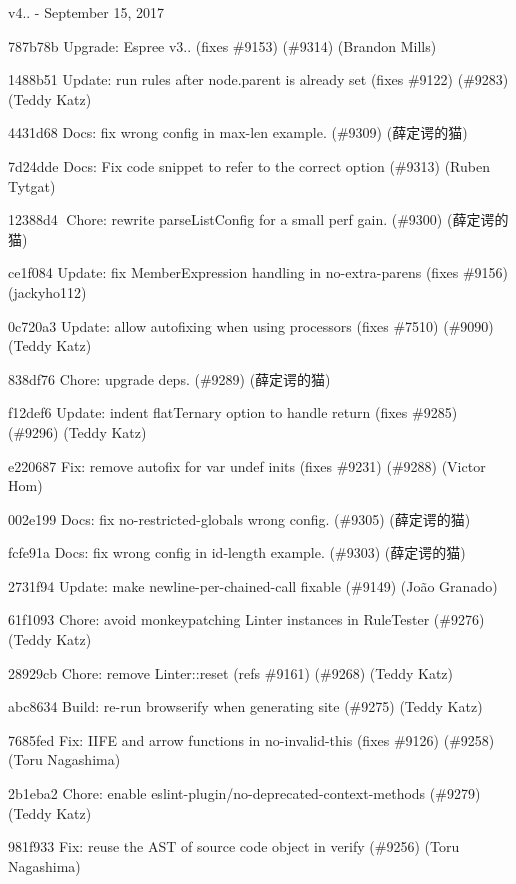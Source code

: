 v4.. -\/ September 15, 2017


\begin{DoxyItemize}
\item 787b78b Upgrade\+: Espree v3.. (fixes \#9153) (\#9314) (Brandon Mills)
\item 1488b51 Update\+: run rules after {\ttfamily node.\+parent} is already set (fixes \#9122) (\#9283) (Teddy Katz)
\item 4431d68 Docs\+: fix wrong config in max-\/len example. (\#9309) (薛定谔的猫)
\item 7d24dde Docs\+: Fix code snippet to refer to the correct option (\#9313) (Ruben Tytgat)
\item 12388d4 \+Chore\+: rewrite parse\+List\+Config for a small perf gain. (\#9300) (薛定谔的猫)
\item ce1f084 Update\+: fix Member\+Expression handling in no-\/extra-\/parens (fixes \#9156) (jackyho112)
\item 0c720a3 Update\+: allow autofixing when using processors (fixes \#7510) (\#9090) (Teddy Katz)
\item 838df76 Chore\+: upgrade deps. (\#9289) (薛定谔的猫)
\item f12def6 Update\+: indent flat\+Ternary option to handle {\ttfamily return} (fixes \#9285) (\#9296) (Teddy Katz)
\item e220687 Fix\+: remove autofix for var undef inits (fixes \#9231) (\#9288) (Victor Hom)
\item 002e199 Docs\+: fix no-\/restricted-\/globals wrong config. (\#9305) (薛定谔的猫)
\item fcfe91a Docs\+: fix wrong config in id-\/length example. (\#9303) (薛定谔的猫)
\item 2731f94 Update\+: make newline-\/per-\/chained-\/call fixable (\#9149) (João Granado)
\item 61f1093 Chore\+: avoid monkeypatching Linter instances in Rule\+Tester (\#9276) (Teddy Katz)
\item 28929cb Chore\+: remove Linter\+::reset (refs \#9161) (\#9268) (Teddy Katz)
\item abc8634 Build\+: re-\/run browserify when generating site (\#9275) (Teddy Katz)
\item 7685fed Fix\+: I\+I\+FE and arrow functions in no-\/invalid-\/this (fixes \#9126) (\#9258) (Toru Nagashima)
\item 2b1eba2 Chore\+: enable eslint-\/plugin/no-\/deprecated-\/context-\/methods (\#9279) (Teddy Katz)
\item 981f933 Fix\+: reuse the A\+ST of source code object in verify (\#9256) (Toru Nagashima)

\end{DoxyItemize}
